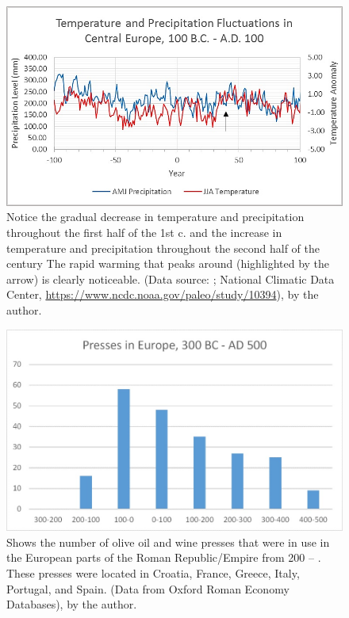 	
	\begin{figure}[!p]
		\includegraphics[width=\linewidth]{figures/Davis_Agroeconomy_Fig8.jpg}
		\centering
		\caption{Notice the gradual decrease in temperature and precipitation throughout the first half of the 1st c. \BC and the increase in temperature and precipitation throughout the second half of the  century \BC The rapid warming that peaks around  (highlighted by the arrow) is clearly noticeable. (Data source: \textcite{Büntgen_2011b}; National Climatic Data Center, \url{https://www.ncdc.noaa.gov/paleo/study/10394}), by the author.}
		\label{fig:DavisFig8}
	\end{figure}
	
	
	
	\begin{figure}[!p]
		\includegraphics[width=\linewidth]{figures/Davis_Agroeconomy_Fig9.jpg}
		\centering
		\caption{Shows the number of olive oil and wine presses that were in use in the European parts of the Roman Republic/Empire from 200 \BC – . These presses were located in Croatia, France, Greece, Italy, Portugal, and Spain. (Data from Oxford Roman Economy Databases), by the author.}
		\label{fig:DavisFig9}
	\end{figure}
	
